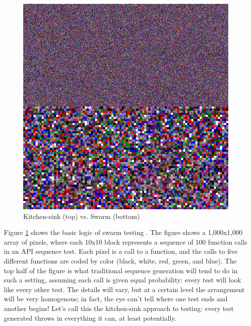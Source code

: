 \documentclass[sigplan,review]{acmart}
\begin{document}
\begin{figure}
  \centering
  \includegraphics[width=\columnwidth]{swarm.png}
  \caption{Kitchen-sink (top) vs. Swarm (bottom)}
  \label{fig:swarmcol}
\end{figure}

Figure \ref{fig:swarmcol} shows the basic logic of swarm testing
\cite{ISSTA12}.  The figure shows a 1,000x1,000 array of pixels, where
each 10x10 block represents a sequence of 100 function calls in
an API sequence test.  Each pixel is a call to a function, and the
calls to five different functions are coded by color (black, white,
red, green, and blue).  The top half of the figure is what traditional
sequence generation will tend to do in such a setting, assuming each
call is given equal probability:  every test will look like every
other test.  The details will vary, but at a certain level the
arrangement will be very homogenous; in fact, the eye can't tell where
one test ends and another begins!  Let's call this the kitchen-sink
approach to testing:  every test generated throws in everything it can, at
least potentially.
\end{document}
